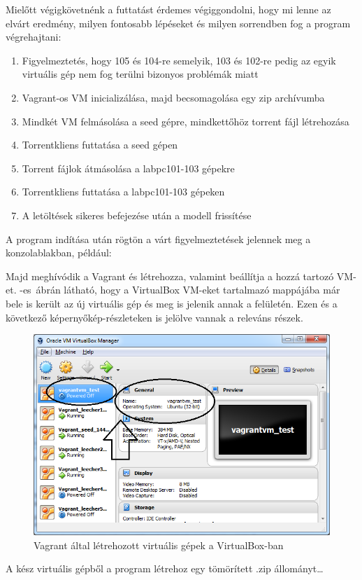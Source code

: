 \FloatBarrier

Mielőtt végigkövetnénk a futtatást érdemes végiggondolni, hogy mi lenne az elvárt eredmény, milyen fontosabb lépéseket és milyen sorrendben fog a program végrehajtani:

\begin{enumerate}
  \item Figyelmeztetés, hogy 105 és 104-re semelyik, 103 és 102-re pedig az egyik virtuális gép nem fog terülni bizonyos problémák miatt
  \item Vagrant-os VM inicializálása, majd becsomagolása egy zip archívumba
  \item Mindkét VM felmásolása a seed gépre, mindkettőhöz torrent fájl létrehozása
  \item Torrentkliens futtatása a seed gépen
  \item Torrent fájlok átmásolása a labpc101-103 gépekre
  \item Torrentkliens futtatása a labpc101-103 gépeken
  \item A letöltések sikeres befejezése után a modell frissítése
\end{enumerate}

A program indítása után rögtön a várt figyelmeztetések jelennek meg a konzolablakban, például:


Majd meghívódik a Vagrant és létrehozza, valamint beállítja a hozzá tartozó VM-et. -es~ábrán látható, hogy a VirtualBox VM-eket tartalmazó mappájába már bele is került az új virtuális gép és meg is jelenik annak a felületén. Ezen és a következő képernyőkép-részleteken is jelölve vannak a releváns részek.

\begin{figure}[ht]
\centering
\includegraphics[width=140mm, keepaspectratio]{figures/test_vbox.png}
\caption{Vagrant által létrehozott virtuális gépek a VirtualBox-ban}
\label{fig:vboxcap}
\end{figure}
A kész virtuális gépből a program létrehoz egy tömörített .zip állományt\ldots

